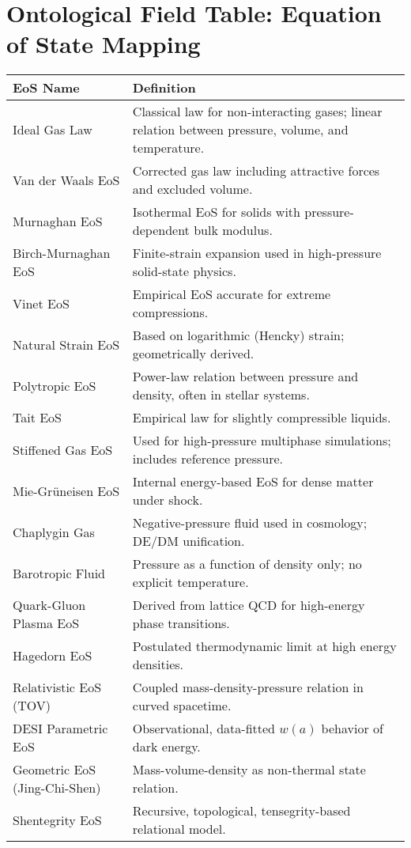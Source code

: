 \documentclass{article}
\begin{document}
\section*{Ontological Field Table: Equation of State Mapping}

\small
{}

\begin{longtable}{|>{\raggedright\arraybackslash}p{5cm}|>{\raggedright\arraybackslash}p{10cm}|}
\hline
\rowcolor{black!20}
\textbf{EoS Name} & \textbf{Definition} \\
\hline
Ideal Gas Law & Classical law for non-interacting gases; linear relation between pressure, volume, and temperature. \\
Van der Waals EoS & Corrected gas law including attractive forces and excluded volume. \\
Murnaghan EoS & Isothermal EoS for solids with pressure-dependent bulk modulus. \\
Birch-Murnaghan EoS & Finite-strain expansion used in high-pressure solid-state physics. \\
Vinet EoS & Empirical EoS accurate for extreme compressions. \\
Natural Strain EoS & Based on logarithmic (Hencky) strain; geometrically derived. \\
Polytropic EoS & Power-law relation between pressure and density, often in stellar systems. \\
Tait EoS & Empirical law for slightly compressible liquids. \\
Stiffened Gas EoS & Used for high-pressure multiphase simulations; includes reference pressure. \\
Mie-Grüneisen EoS & Internal energy-based EoS for dense matter under shock. \\
Chaplygin Gas & Negative-pressure fluid used in cosmology; DE/DM unification. \\
Barotropic Fluid & Pressure as a function of density only; no explicit temperature. \\
Quark-Gluon Plasma EoS & Derived from lattice QCD for high-energy phase transitions. \\
Hagedorn EoS & Postulated thermodynamic limit at high energy densities. \\
Relativistic EoS (TOV) & Coupled mass-density-pressure relation in curved spacetime. \\
DESI Parametric EoS & Observational, data-fitted $w(a)$ behavior of dark energy. \\
Geometric EoS (Jing-Chi-Shen) & Mass-volume-density as non-thermal state relation. \\
Shentegrity EoS & Recursive, topological, tensegrity-based relational model. \\
\hline
\end{longtable}
\end{document}
